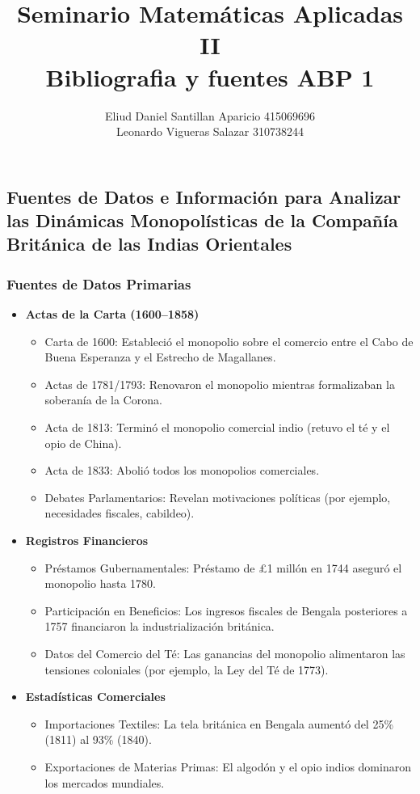 \documentclass[a4paper,12pt]{article}
\title{\textbf{Seminario Matemáticas Aplicadas II\\Bibliografia y fuentes ABP 1}}
\author{Eliud Daniel Santillan Aparicio 415069696 \\ Leonardo Vigueras Salazar 310738244}
\date{}
\begin{document}
\maketitle



\subsection*{Fuentes de Datos e Información para Analizar las Dinámicas Monopolísticas de la Compañía Británica de las Indias Orientales}

\subsubsection*{Fuentes de Datos Primarias}

\begin{itemize}
    \item \textbf{Actas de la Carta (1600–1858)}
    \begin{itemize}
        \item Carta de 1600: Estableció el monopolio sobre el comercio entre el Cabo de Buena Esperanza y el Estrecho de Magallanes\cite{ref4}.
        \item Actas de 1781/1793: Renovaron el monopolio mientras formalizaban la soberanía de la Corona\cite{ref1,ref5}.
        \item Acta de 1813: Terminó el monopolio comercial indio (retuvo el té y el opio de China)\cite{ref3,ref6}.
        \item Acta de 1833: Abolió todos los monopolios comerciales\cite{ref3,ref5}.
        \item Debates Parlamentarios: Revelan motivaciones políticas (por ejemplo, necesidades fiscales, cabildeo)\cite{ref1,ref5}.
    \end{itemize}
    \item \textbf{Registros Financieros}
    \begin{itemize}
        \item Préstamos Gubernamentales: Préstamo de £1 millón en 1744 aseguró el monopolio hasta 1780\cite{ref1}.
        \item Participación en Beneficios: Los ingresos fiscales de Bengala posteriores a 1757 financiaron la industrialización británica\cite{ref2,ref6}.
        \item Datos del Comercio del Té: Las ganancias del monopolio alimentaron las tensiones coloniales (por ejemplo, la Ley del Té de 1773)\cite{ref8}.
    \end{itemize}
    \item \textbf{Estadísticas Comerciales}
    \begin{itemize}
        \item Importaciones Textiles: La tela británica en Bengala aumentó del 25\% (1811) al 93\% (1840)\cite{ref2}.
        \item Exportaciones de Materias Primas: El algodón y el opio indios dominaron los mercados mundiales\cite{ref2,ref7}.
    \end{itemize}
\end{itemize}
\end{document}
